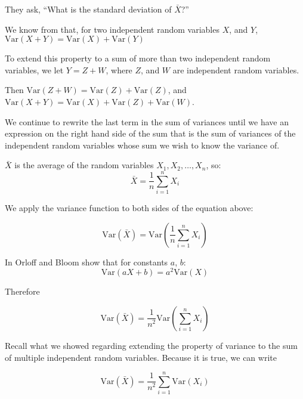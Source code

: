\documentclass[a4paper,11pt]{article}
\begin{document}
They ask, ``What is the standard deviation of $\bar{X}$?''

We know from \cite{reading5a} that, for two independent random variables $X$,
and $Y$, $\text{Var}\left( X + Y \right) = \text{Var}\left( X \right) +
\text{Var}\left( Y \right)$

To extend this property to a sum of more than two independent random variables,
we let $Y=Z+W$, where $Z$, and $W$ are independent random variables.

Then $\text{Var}\left( Z + W \right) = \text{Var}\left( Z \right) +
\text{Var}\left( Z \right)$, and $\text{Var}\left( X + Y\right) =
  \text{Var}\left( X \right) + \text{Var}\left(Z \right)
  + \text{Var}\left(W \right)$.

We continue to rewrite the last term in the sum of variances until we have
an expression on the right hand side of the sum that is the sum of variances
of the independent random variables whose sum we wish to know the variance of.

$\bar{X}$ is the average of the random variables $X_{1}, X_{2}, \ldots, X_{n}$,
so:
\begin{equation}
\bar{X}
  = \frac{1}{n}\sum_{i=1}^{n} X_{i}
\end{equation}

We apply the variance function to both sides of the equation above:


\begin{equation}
\text{Var}\left( \bar{X} \right)
  = \text{Var} \left( \frac{1}{n}\sum_{i=1}^{n} X_{i} \right)
\end{equation}

In \cite{reading5a} Orloff and Bloom show that for constants $a$, $b$:
\begin{equation}
  \text{Var} \left( aX + b \right) = a^{2}\text{Var}\left(X \right)
\end{equation}

Therefore

\begin{equation}
\text{Var}\left( \bar{X} \right)
  = \frac{1}{n^{2}} \text{Var} \left( \sum_{i=1}^{n} X_{i} \right)
\end{equation}

Recall what we showed regarding extending the property of variance to the sum
of multiple independent random variables. Because it is true, we can write

\begin{equation}
\text{Var}\left( \bar{X} \right)
  = \frac{1}{n^{2}} \sum_{i=1}^{n} \text{Var} \left( X_{i} \right)
\end{equation}
\end{document}
